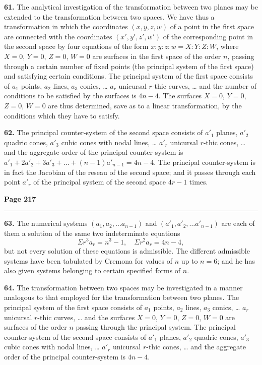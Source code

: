 \documentclass[12pt,a4paper]{article}
\theoremstyle{plain}
\theoremstyle{definition}
\theoremstyle{remark}
\begin{document}
\noindent\textbf{61.} The analytical investigation of the transformation between two planes may be extended to the transformation between two spaces. We have thus a transformation in which the coordinates $(x, y, z, w)$ of a point in the first space are connected with the coordinates $(x', y', z', w')$ of the corresponding point in the second space by four equations of the form $x : y : z : w = X : Y : Z : W$, where $X = 0$, $Y = 0$, $Z = 0$, $W = 0$ are surfaces in the first space of the order $n$, passing through a certain number of fixed points (the principal system of the first space) and satisfying certain conditions. The principal system of the first space consists of $a_1$ points, $a_2$ lines, $a_3$ conics, \ldots{} $a_r$ unicursal $r$-thic curves, \ldots{} and the number of conditions to be satisfied by the surfaces is $4n - 4$. The surfaces $X = 0$, $Y = 0$, $Z = 0$, $W = 0$ are thus determined, save as to a linear transformation, by the conditions which they have to satisfy.

\textbf{62.} The principal counter-system of the second space consists of $a'_1$ planes, $a'_2$ quadric cones, $a'_3$ cubic cones with nodal lines, \ldots{} $a'_r$ unicursal $r$-thic cones, \ldots{} and the aggregate order of the principal counter-system is $a'_1 + 2a'_2 + 3a'_3 + \ldots + (n - 1)a'_{n-1} = 4n - 4$. The principal counter-system is in fact the Jacobian of the reseau of the second space; and it passes through each point $a'_r$ of the principal system of the second space $4r - 1$ times.

\newpage
\noindent\textbf{Page 217}\\
\noindent\rule{\textwidth}{0.4pt}

\smallskip

\noindent\textbf{63.} The numerical systems $(a_1, a_2, \ldots a_{n-1})$ and $(a'_1, a'_2, \ldots a'_{n-1})$ are each of them a solution of the same two indeterminate equations
\[
\Sigma r^3 a_r = n^3 - 1, \quad \Sigma r^2 a_r = 4n - 4,
\]
but not every solution of these equations is admissible. The different admissible systems have been tabulated by Cremona for values of $n$ up to $n = 6$; and he has also given systems belonging to certain specified forms of $n$.

\textbf{64.} The transformation between two spaces may be investigated in a manner analogous to that employed for the transformation between two planes. The principal system of the first space consists of $a_1$ points, $a_2$ lines, $a_3$ conics, \ldots{} $a_r$ unicursal $r$-thic curves, \ldots{} and the surfaces $X = 0$, $Y = 0$, $Z = 0$, $W = 0$ are surfaces of the order $n$ passing through the principal system. The principal counter-system of the second space consists of $a'_1$ planes, $a'_2$ quadric cones, $a'_3$ cubic cones with nodal lines, \ldots{} $a'_r$ unicursal $r$-thic cones, \ldots{} and the aggregate order of the principal counter-system is $4n - 4$.
\end{document}
